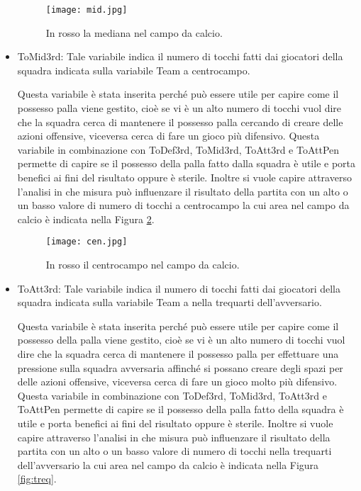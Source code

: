 \begin{itemize}
	\begin{figure}[!ht]
		\begin{center}
			\texttt{[image: mid.jpg]}
			\caption{In rosso la mediana nel campo da calcio.} 
			\label{fig:def}
		\end{center}
	\end{figure}
	\item \textsf{ToMid3rd}: Tale variabile indica il numero di tocchi fatti dai giocatori della squadra indicata sulla variabile \textsf{Team} a centrocampo. 
	
	Questa variabile è stata inserita perché può essere utile per capire come il possesso palla viene gestito, cioè se vi è un alto numero di tocchi vuol dire che la squadra cerca di mantenere il possesso palla cercando di creare delle azioni offensive, viceversa cerca di fare un gioco più difensivo. Questa variabile in combinazione con \textsf{ToDef3rd}, \textsf{ToMid3rd}, \textsf{ToAtt3rd} e \textsf{ToAttPen} permette di capire se il possesso della palla fatto dalla squadra è utile e porta benefici ai fini del risultato oppure è sterile. Inoltre si vuole capire attraverso l'analisi in che misura può influenzare il risultato della partita con un alto o un basso valore di numero di tocchi a centrocampo la cui area nel campo da calcio è indicata nella Figura \ref{fig:cen}.
	
	\begin{figure}[!ht]
		\begin{center}
			\texttt{[image: cen.jpg]}
			\caption{In rosso il centrocampo nel campo da calcio.}
			\label{fig:cen}
		\end{center}
	\end{figure}
	
	\item \textsf{ToAtt3rd}: Tale variabile indica il numero di tocchi fatti dai giocatori della squadra indicata sulla variabile \textsf{Team} a nella trequarti dell'avversario. 
	
	Questa variabile è stata inserita perché può essere utile per capire come il possesso della palla viene gestito, cioè se vi è un alto numero di tocchi vuol dire che la squadra cerca di mantenere il possesso palla per effettuare una pressione sulla squadra avversaria affinché si possano creare degli spazi per delle azioni offensive, viceversa cerca di fare un gioco molto più difensivo. Questa variabile in combinazione con \textsf{ToDef3rd}, \textsf{ToMid3rd}, \textsf{ToAtt3rd} e \textsf{ToAttPen} permette di capire se il possesso della palla fatto della squadra è utile e porta benefici ai fini del risultato oppure è sterile. Inoltre si vuole capire attraverso l'analisi in che misura può influenzare il risultato della partita con un alto o un basso valore di numero di tocchi nella trequarti dell'avversario la cui area nel campo da calcio è indicata nella Figura \ref{fig:treq}.
	

\end{itemize}
